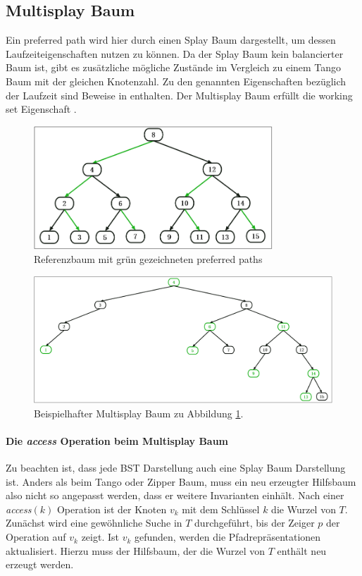 \documentclass[a4paper,12pt]{article}
\begin{document}
\subsection{Multisplay Baum}
Ein preferred path wird hier durch einen Splay Baum dargestellt, um dessen Laufzeiteigenschaften nutzen zu können. Da der Splay Baum kein balancierter Baum ist, gibt es zusätzliche mögliche Zustände im Vergleich zu einem Tango Baum mit der gleichen Knotenzahl. Zu den genannten Eigenschaften bezüglich der Laufzeit sind Beweise in \cite{multisplay} enthalten. Der Multisplay Baum erfüllt die working set Eigenschaft \cite{porpMultiSplay}. 
\begin{figure}[H]
	\centering
	\includegraphics[width= 0.8\textwidth]{"Medien/Multisplay/referenzTree"}
	\caption {Referenzbaum mit grün gezeichneten preferred paths }
	\label{fig:referenzTree}
\end{figure} 
\begin{figure}[H]
	\centering
	\includegraphics[width= 1\textwidth]{"Medien/Multisplay/pfadRepresentation"}
	\caption {Beispielhafter Multisplay Baum zu Abbildung \ref{fig:referenzTree}.}
	\label{fig:pfadRepresentation}
\end{figure} 
\paragraph{Die \textit{access} Operation beim Multisplay Baum}
Zu beachten ist, dass jede BST Darstellung auch eine Splay Baum Darstellung ist. Anders als beim Tango oder Zipper Baum, muss ein neu erzeugter Hilfsbaum also nicht so angepasst werden, dass er weitere Invarianten einhält.  Nach einer \textit{access}$\left(k\right)$ Operation ist der Knoten $v_k$ mit dem Schlüssel $k$ die Wurzel von $T$. Zunächst wird eine gewöhnliche Suche in $T$ durchgeführt, bis der Zeiger $p$ der Operation auf $v_k$ zeigt. Ist $v_k$ gefunden, werden die Pfadrepräsentationen aktualisiert. Hierzu muss der Hilfsbaum, der die Wurzel von $T$ enthält neu erzeugt werden. \\
\end{document}
